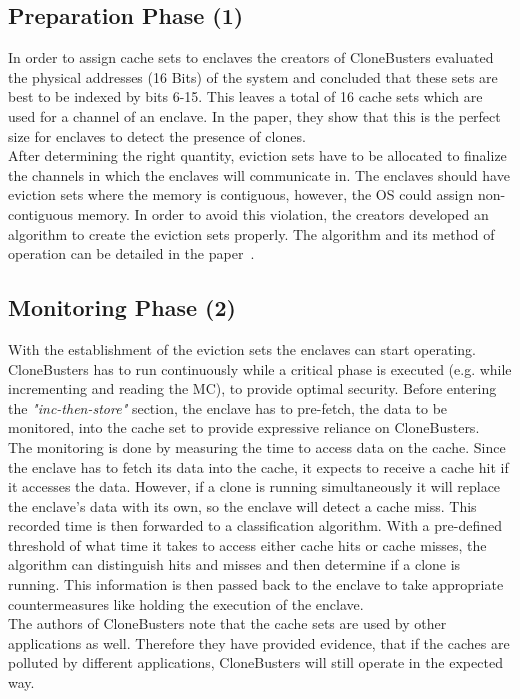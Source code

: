 \subsection{Preparation Phase (1)}
In order to assign cache sets to enclaves the creators of CloneBusters evaluated the physical addresses (16 Bits) of the system and concluded that these sets are best to be indexed by bits 6-15. This leaves a total of 16 cache sets which are used for a channel of an enclave. In the paper, they show that this is the perfect size for enclaves to detect the presence of clones.\\
After determining the right quantity, eviction sets have to be allocated to finalize the channels in which the enclaves will communicate in. The enclaves should have eviction sets where the memory is contiguous, however, the OS could assign non-contiguous memory. In order to avoid this violation, the creators developed an algorithm to create the eviction sets properly. The algorithm and its method of operation can be detailed in the paper~\cite{nfw}.

\subsection{Monitoring Phase (2)}
With the establishment of the eviction sets the enclaves can start operating. CloneBusters has to run continuously while a critical phase is executed (e.g. while incrementing and reading the MC), to provide optimal security. Before entering the \textit{"inc-then-store"} section, the enclave has to pre-fetch, the data to be monitored, into the cache set to provide expressive reliance on CloneBusters. \\
The monitoring is done by measuring the time to access data on the cache. Since the enclave has to fetch its data into the cache, it expects to receive a cache hit if it accesses the data. However, if a clone is running simultaneously it will replace the enclave's data with its own, so the enclave will detect a cache miss. This recorded time is then forwarded to a classification algorithm. With a pre-defined threshold of what time it takes to access either cache hits or cache misses, the algorithm can distinguish hits and misses and then determine if a clone is running. This information is then passed back to the enclave to take appropriate countermeasures like holding the execution of the enclave.\\
The authors of CloneBusters note that the cache sets are used by other applications as well. Therefore they have provided evidence, that if the caches are polluted by different applications, CloneBusters will still operate in the expected way.